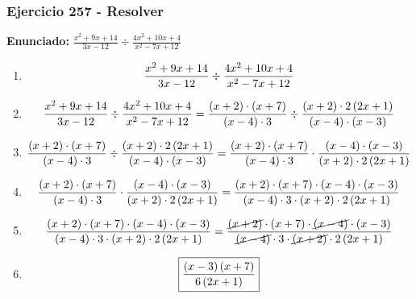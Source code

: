 \documentclass[11pt,a4paper]{article}
\newcommand{\fitmath}[1]{%
\[
\setbox0=\hbox{$\displaystyle #1$}%
\ifdim\wd0>\linewidth
\resizebox{\linewidth}{!}{$\displaystyle #1$}%
\else
#1%
\fi
\]
}
\begin{document}
\subsubsection*{Ejercicio 257 - Resolver}
\textbf{Enunciado:} $ \frac{x^{2} + 9 x + 14}{3 x - 12} \div \frac{4 x^{2} + 10 x + 4}{x^{2} - 7 x + 12} $\par
\begin{enumerate}[leftmargin=2em]
\item \fitmath{\frac{x^{2} + 9 x + 14}{3 x - 12} \div \frac{4 x^{2} + 10 x + 4}{x^{2} - 7 x + 12}}
\item \fitmath{\frac{x^{2} + 9 x + 14}{3 x - 12} \div \frac{4 x^{2} + 10 x + 4}{x^{2} - 7 x + 12}= \frac{\left(x + 2\right)\cdot \left(x + 7\right)}{\left(x - 4\right)\cdot 3} \div \frac{\left(x + 2\right)\cdot 2 \left(2 x + 1\right)}{\left(x - 4\right)\cdot \left(x - 3\right)}}
\item \fitmath{\frac{\left(x + 2\right)\cdot \left(x + 7\right)}{\left(x - 4\right)\cdot 3}\div \frac{\left(x + 2\right)\cdot 2 \left(2 x + 1\right)}{\left(x - 4\right)\cdot \left(x - 3\right)}= \frac{\left(x + 2\right)\cdot \left(x + 7\right)}{\left(x - 4\right)\cdot 3}\cdot \frac{\left(x - 4\right)\cdot \left(x - 3\right)}{\left(x + 2\right)\cdot 2 \left(2 x + 1\right)}}
\item \fitmath{\frac{\left(x + 2\right)\cdot \left(x + 7\right)}{\left(x - 4\right)\cdot 3}\cdot \frac{\left(x - 4\right)\cdot \left(x - 3\right)}{\left(x + 2\right)\cdot 2 \left(2 x + 1\right)}= \frac{\left(x + 2\right)\cdot \left(x + 7\right)\cdot \left(x - 4\right)\cdot \left(x - 3\right)}{\left(x - 4\right)\cdot 3\cdot \left(x + 2\right)\cdot 2 \left(2 x + 1\right)}}
\item \fitmath{\frac{\left(x + 2\right)\cdot \left(x + 7\right)\cdot \left(x - 4\right)\cdot \left(x - 3\right)}{\left(x - 4\right)\cdot 3\cdot \left(x + 2\right)\cdot 2 \left(2 x + 1\right)}= \frac{\cancel{\left(x + 2\right)}\cdot \left(x + 7\right)\cdot \cancel{\left(x - 4\right)}\cdot \left(x - 3\right)}{\cancel{\left(x - 4\right)}\cdot 3\cdot \cancel{\left(x + 2\right)}\cdot 2 \left(2 x + 1\right)}}
\item \fitmath{\boxed{\frac{\left(x - 3\right) \left(x + 7\right)}{6 \left(2 x + 1\right)}}}
\end{enumerate}

\vspace{0.12cm}
\end{document}
